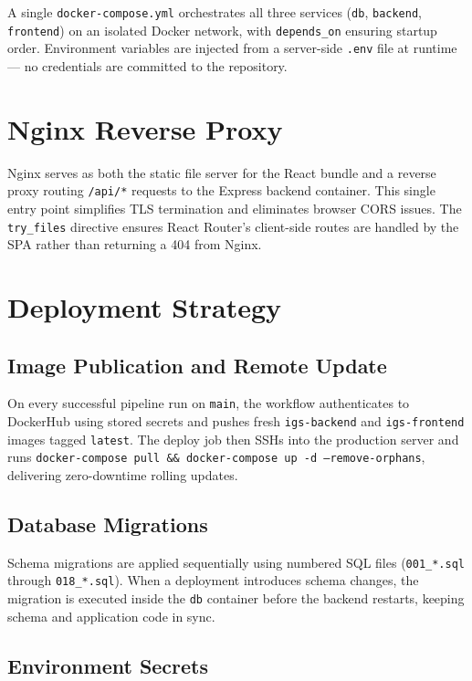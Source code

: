 A single \texttt{docker-compose.yml} orchestrates all three services (\texttt{db}, \texttt{backend}, \texttt{frontend}) on an isolated Docker network, with \texttt{depends\_on} ensuring startup order. Environment variables are injected from a server-side \texttt{.env} file at runtime — no credentials are committed to the repository.

\section{Nginx Reverse Proxy}

Nginx serves as both the static file server for the React bundle and a reverse proxy routing \texttt{/api/*} requests to the Express backend container. This single entry point simplifies TLS termination and eliminates browser CORS issues. The \texttt{try\_files} directive ensures React Router's client-side routes are handled by the SPA rather than returning a 404 from Nginx.

\section{Deployment Strategy}

\subsection{Image Publication and Remote Update}

On every successful pipeline run on \texttt{main}, the workflow authenticates to DockerHub using stored secrets and pushes fresh \texttt{igs-backend} and \texttt{igs-frontend} images tagged \texttt{latest}. The deploy job then SSHs into the production server and runs \texttt{docker-compose pull \&\& docker-compose up -d --remove-orphans}, delivering zero-downtime rolling updates.

\subsection{Database Migrations}

Schema migrations are applied sequentially using numbered SQL files (\texttt{001\_*.sql} through \texttt{018\_*.sql}). When a deployment introduces schema changes, the migration is executed inside the \texttt{db} container before the backend restarts, keeping schema and application code in sync.

\subsection{Environment Secrets}

